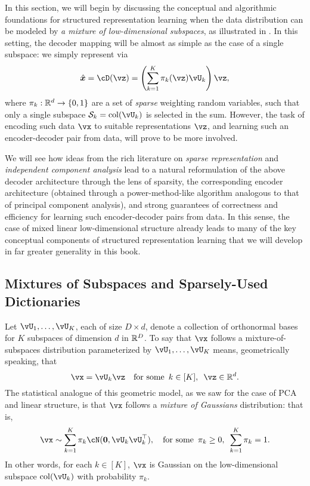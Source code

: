 \documentclass[../../book-main.tex]{subfiles}
\begin{document}
In this section, we will begin by discussing the conceptual and algorithmic
foundations for structured representation learning when the data distribution
can be modeled by {\em a mixture of low-dimensional subspaces}, as illustrated in . In this setting, the decoder mapping will be almost as simple as the case of a single subspace: we simply represent via
\begin{equation}\label{eq:mixture-subspaces-decoder-first-cut}
    \hat{\x} = \cD(\vz) = \left( \sum_{k=1}^K \pi_k(\vz)\vU_k \right) \vz,
\end{equation}
where $\pi_k : \R^d \to \set{0,1}$ are a set of \textit{sparse} weighting random
variables, such that only a single subspace $\mathcal{S}_k
= \mathop{\mathrm{col}}(\vU_k) $ is selected in the sum.
However, the task of encoding such data $\vx$ to suitable representations $\vz$, and learning such an encoder-decoder pair from data, will prove to be more involved.

We will see how ideas from the rich literature on \textit{sparse representation}
and \textit{independent component analysis} lead to a natural reformulation of
the above decoder architecture through the lens of sparsity, the corresponding
encoder architecture (obtained through a power-method-like algorithm analogous
to that of principal component analysis), and strong guarantees of correctness
and efficiency for learning such encoder-decoder pairs from data. In this sense,
the case of mixed linear low-dimensional structure already leads to many of the
key conceptual components of structured representation learning that we will develop in
far greater generality in this book.


\subsection{Mixtures of Subspaces and Sparsely-Used
Dictionaries}\label{sec:mixture-and-dict}


Let $\vU_1, \dots, \vU_K$, each of size $D \times d$, denote a collection of orthonormal bases for $K$ subspaces of dimension $d$ in $\mathbb{R}^D$.
To say that $\vx$ follows a mixture-of-subspaces distribution parameterized by $\vU_1, \dots, \vU_K$ means, geometrically speaking,
that 
\begin{equation}\label{eq:mixture-of-subspaces-geometric}
    \vx = \vU_k \vz  \quad \text{for some} \enspace k \in [K],\enspace \vz \in \R^d.
\end{equation}
The statistical analogue of this geometric model, as we saw for the case of PCA and linear structure,
is that $\vx$ follows a \textit{mixture of Gaussians} distribution: that is,
\begin{equation}\label{eq:mixture-of-subspaces-statistical}
    \vx \sim \sum_{k=1}^K \pi_k \cN(\mathbf{0}, \vU_k\vU_k^\top), \quad \text{for some} \enspace \pi_k \geq 0,\enspace \sum_{k=1}^K \pi_k = 1.
\end{equation}
In other words, for each $k \in [K]$, $\vx$ is Gaussian on the low-dimensional
subspace $\mathop{\mathrm{col}}(\vU_k)$  with probability $\pi_k$.
\end{document}
